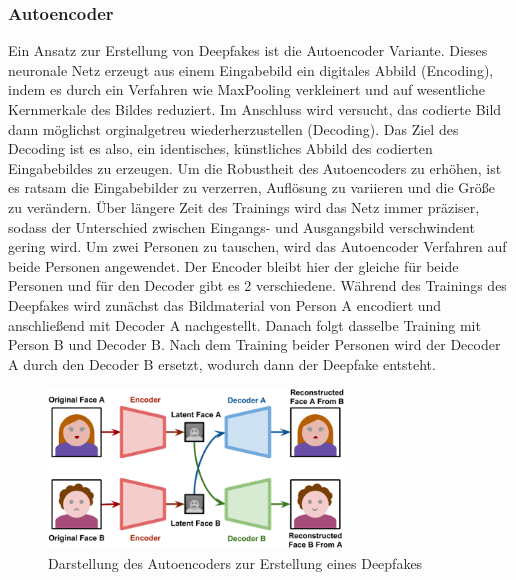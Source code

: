 \subsubsection{Autoencoder}
Ein Ansatz zur Erstellung von Deepfakes ist die Autoencoder Variante. Dieses neuronale Netz erzeugt aus einem Eingabebild ein digitales Abbild (Encoding), indem es durch ein Verfahren wie \gls{MaxPooling} verkleinert und auf wesentliche Kernmerkale des Bildes reduziert. Im Anschluss wird versucht, das codierte Bild dann möglichst orginalgetreu wiederherzustellen (Decoding). Das Ziel des Decoding ist es also, ein identisches, künstliches Abbild des codierten Eingabebildes zu erzeugen. Um die Robustheit des Autoencoders zu erhöhen, ist es ratsam die Eingabebilder zu verzerren, Auflösung zu variieren und die Größe zu verändern.  Über längere Zeit des Trainings wird das Netz immer präziser, sodass der Unterschied zwischen Eingangs- und Ausgangsbild verschwindent gering wird.\newline
Um zwei Personen zu tauschen, wird das Autoencoder Verfahren auf beide Personen angewendet. Der Encoder bleibt hier der gleiche für beide Personen und für den Decoder gibt es 2 verschiedene. Während des Trainings des Deepfakes wird zunächst das Bildmaterial von Person A encodiert und anschließend mit Decoder A nachgestellt. Danach folgt dasselbe Training mit Person B und Decoder B. Nach dem Training beider Personen wird der Decoder A durch den Decoder B ersetzt, wodurch dann der Deepfake entsteht.\cite{HochschuleDerMedien}
\begin{figure}[H]
    \includegraphics[width=0.7\textwidth]{Bilder/Autoencoder}
    \centering
    \caption{Darstellung des Autoencoders zur Erstellung eines Deepfakes\cite{HochschuleDerMedien}}
    \label{fig:Autoencoder}
\end{figure}

